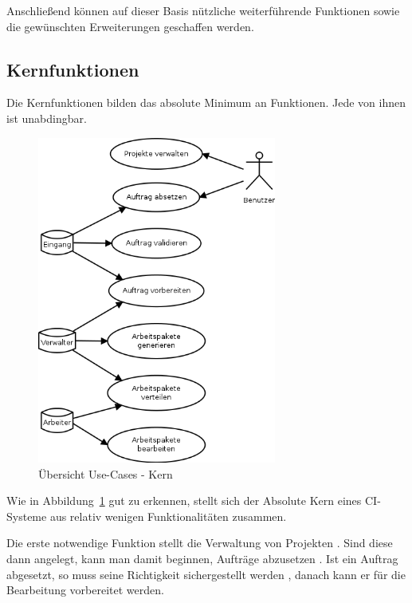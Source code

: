 Anschließend können auf dieser Basis nützliche weiterführende Funktionen
sowie die gewünschten Erweiterungen geschaffen werden.


\subsection{Kernfunktionen}

Die Kernfunktionen bilden das absolute Minimum an Funktionen.
Jede von ihnen ist unabdingbar.

\begin{figure}[ht]
  \centering
  \includegraphics[width=0.7\textwidth]{imageinput/use-case-muss.png}
  \caption{\"Ubersicht Use-Cases - Kern}
  \label{fig:use-case-muss}
\end{figure}

Wie in Abbildung~\ref{fig:use-case-muss} gut zu erkennen,
stellt sich der Absolute Kern eines CI-Systeme aus relativ wenigen Funktionalitäten zusammen.

Die erste notwendige Funktion stellt die Verwaltung von Projekten .
Sind diese dann angelegt, kann man damit beginnen, Aufträge abzusetzen .
Ist ein Auftrag abgesetzt, so muss seine Richtigkeit sichergestellt werden ,
danach kann er für die Bearbeitung  vorbereitet werden.

